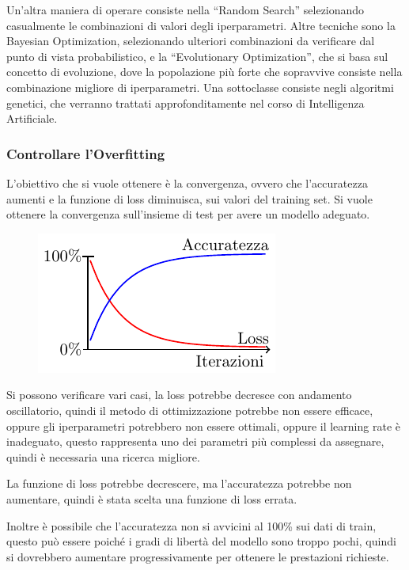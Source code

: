 \documentclass{article}
\numberwithin{equation}{subsection}
\begin{document}
Un'altra maniera di operare consiste nella ``Random Search'' selezionando casualmente le 
combinazioni di valori degli iperparametri. 
Altre tecniche sono la Bayesian Optimization, selezionando ulteriori combinazioni da verificare dal punto di vista probabilistico, e la ``Evolutionary Optimization'', che si 
basa sul concetto di evoluzione, dove la popolazione più forte che sopravvive consiste nella combinazione migliore di iperparametri. Una sottoclasse consiste negli algoritmi genetici, che verranno trattati approfonditamente nel corso di Intelligenza Artificiale. 

\subsubsection{Controllare l'Overfitting}

L'obiettivo che si vuole ottenere è la convergenza, ovvero che l'accuratezza aumenti 
e la funzione di loss diminuisca, sui valori del training set. Si vuole ottenere la convergenza sull'insieme di test per avere un modello adeguato. 

\begin{figure}[H]%
    \centering%
    \includegraphics{convergenza.pdf}%
\end{figure}

Si possono verificare vari casi, la loss potrebbe decresce con andamento oscillatorio, quindi il metodo di ottimizzazione potrebbe non essere efficace, oppure gli iperparametri potrebbero non essere ottimali, oppure il learning rate è inadeguato, questo rappresenta uno dei parametri più complessi da assegnare, quindi è necessaria una ricerca migliore. 

La funzione di loss potrebbe decrescere, ma l'accuratezza potrebbe non aumentare, quindi è stata scelta una funzione di loss errata. 

Inoltre è possibile che l'accuratezza non si avvicini al 100\% sui dati di train, questo può essere poiché i gradi di libertà del modello sono troppo pochi, quindi si dovrebbero aumentare progressivamente per ottenere le prestazioni richieste. 
\end{document}
